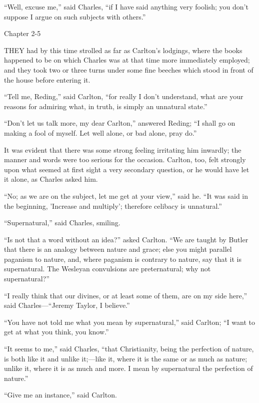 ``Well, excuse me,'' said Charles, ``if I have said
anything very foolish; you don't suppose I argue on such subjects with
others.''

Chapter 2-5


THEY had by this time strolled as far
as Carlton's lodgings, where the books happened to be on which Charles
was at that time more immediately employed; and they took two or three
turns under some fine beeches which stood in front of the house before
entering it.

``Tell me, Reding,'' said Carlton, ``for really I don't
understand, what are your reasons for admiring what, in truth, is
simply an unnatural state.''

``Don't let us talk more, my dear Carlton,'' answered
Reding; ``I shall go on making a fool of myself. Let well alone,
or bad alone, pray do.''

It was evident that there was some strong feeling irritating him
inwardly; the manner and words were too serious for the occasion.
Carlton, too, felt strongly upon what seemed at first sight a very
secondary question, or he would have let it alone, as Charles asked
him.

``No; as we are on the subject, let me get at your view,''
said he. ``It was said in the beginning, 'Increase and multiply';
therefore celibacy is unnatural.''

``Supernatural,'' said Charles, smiling.

``Is not that a word without an idea?'' asked Carlton.
``We are taught by Butler that there is an analogy between nature
and grace; else you might parallel paganism to nature, and, where
paganism is contrary to nature, say that it is supernatural. The
Wesleyan convulsions are preternatural; why not supernatural?''

``I really think that our divines, or at least some of them,
are on my side here,'' said Charles—``Jeremy Taylor, I
believe.''

``You have not told me what you mean by supernatural,''
said Carlton; ``I want to get at what you think, you know.''

``It seems to me,'' said Charles, ``that Christianity,
being the perfection of nature, is both like it and unlike it;—like
it, where it is the same or as much as nature; unlike it, where it is
as much and more. I mean by supernatural the perfection of
nature.''

``Give me an instance,'' said Carlton.


